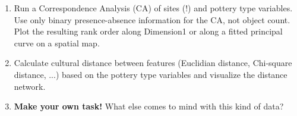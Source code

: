 \documentclass[8pt]{beamer}
\begin{document}
\begin{frame}
\begin{small}
\begin{enumerate}
\item Run a Correspondence Analysis (CA) of sites (!) and pottery type variables. Use only binary presence-absence information for the CA, not object count. Plot the resulting rank order along Dimension1 or along a fitted principal curve on a spatial map.

\item Calculate cultural distance between features (Euclidian distance, Chi-square distance, ...) based on the pottery type variables and visualize the distance network. 

\item \textbf{Make your own task!} What else comes to mind with this kind of data? 

\end{enumerate}
\end{small}
\end{frame}
\end{document}
